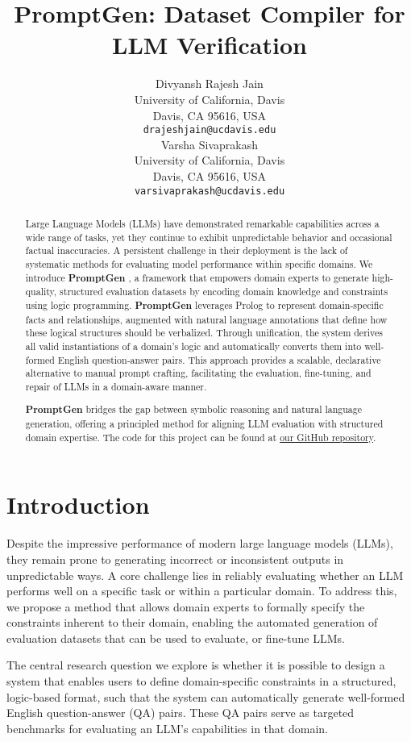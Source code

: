 \documentclass{article}
\title{PromptGen: Dataset Compiler for LLM Verification}
\author{ 
    Divyansh Rajesh Jain \\
    University of California, Davis \\
    Davis, CA 95616, USA \\
    \texttt{drajeshjain@ucdavis.edu} \\
    \And
    Varsha Sivaprakash\\
    University of California, Davis \\
    Davis, CA 95616, USA \\
    \texttt{varsivaprakash@ucdavis.edu} \\
}
\newcommand{\PromptGen}{
    {\bfseries PromptGen}
}
\begin{document}
\maketitle


\begin{abstract}
  Large Language Models (LLMs) have demonstrated remarkable capabilities across a wide range of tasks, 
  yet they continue to exhibit unpredictable behavior and occasional factual inaccuracies. 
  A persistent challenge in their deployment is the lack of systematic methods for evaluating model 
  performance within specific domains. We introduce \PromptGen, a framework that empowers domain experts 
  to generate high-quality, structured evaluation datasets by encoding domain knowledge and constraints 
  using logic programming. \PromptGen leverages Prolog to represent domain-specific facts and relationships, 
  augmented with natural language annotations that define how these logical structures should be verbalized. 
  Through unification, the system derives all valid instantiations of a domain’s logic and automatically converts 
  them into well-formed English question-answer pairs. This approach provides a scalable, declarative alternative 
  to manual prompt crafting, facilitating the evaluation, fine-tuning, and repair of LLMs in a domain-aware manner. 
  \PromptGen bridges the gap between symbolic reasoning and natural language generation, offering a principled method 
  for aligning LLM evaluation with structured domain expertise.
  The code for this project can be found at \href{https://github.com/svarshh/189g_final_project}{our GitHub repository}.

\end{abstract}

\section{Introduction}
Despite the impressive performance of modern large language models (LLMs), 
they remain prone to generating incorrect or inconsistent outputs in 
unpredictable ways. A core challenge lies in reliably evaluating whether 
an LLM performs well on a specific task or within a particular domain. 
To address this, we propose a method that allows domain experts to formally 
specify the constraints inherent to their domain, enabling the automated 
generation of evaluation datasets that can be used to evaluate, or fine-tune LLMs.

The central research question we explore is whether it is possible to design 
a system that enables users to define domain-specific constraints in a structured, 
logic-based format, such that the system can automatically generate well-formed 
English question-answer (QA) pairs. These QA pairs serve as targeted benchmarks 
for evaluating an LLM’s capabilities in that domain.
\end{document}
